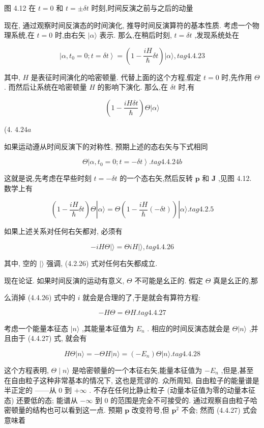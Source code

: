 图 4.12 在 $t = 0$ 和 $t = \pm {\delta t}$ 时刻,时间反演之前与之后的动量

现在, 通过观察时间反演态的时间演化, 推导时间反演算符的基本性质. 考虑一个物理系统,在 $t = 0$ 时,由右矢 $|\alpha \rangle$ 表示. 那么,在稍后时刻, $t = {\delta t}$ ,发现系统处在

$$
\left| {\alpha ,{t}_{0} = 0;t = {\delta t}}\right\rangle = \left( {1 - \frac{iH}{\hslash }{\delta t}}\right) |\alpha \rangle , tag{4. 4.23}
$$

其中, $H$ 是表征时间演化的哈密顿量. 代替上面的这个方程,假定 $t = 0$ 时,先作用 $\Theta$ . 而然后让系统在哈密顿量 $H$ 的影响下演化. 那么,在 ${\delta t}$ 时,有

$$
\left( {1 - \frac{iH\delta t}{\hslash }}\right) \Theta |\alpha \rangle
$$

(4. ${4.24a}$

如果运动遵从时间反演下的对称性, 预期上述的态右矢与下式相同

$$
\Theta \left| {\alpha ,{t}_{0} = 0;t = - {\delta t}}\right\rangle . tag{4. 4.24b}
$$

这就是说,先考虑在早些时刻 $t = - {\delta t}$ 的一个态右矢,然后反转 $\mathbf{p}$ 和 $\mathbf{J}$ ,见图 4.12. 数学上有

$$
\left( {1 - \frac{iH}{\hslash }{\delta t}}\right) \Theta \left| {\alpha \rangle = \Theta \left( {1 - \frac{iH}{\hslash }\left( {-{\delta t}}\right) }\right) }\right| \alpha \rangle . tag{4. 2.5}
$$

如果上述关系对任何右矢都对, 必须有

$$
- {iH\Theta }\left| {\rangle = {\Theta iH}}\right| \rangle , tag{4. 4.26}
$$

其中, 空的 $|\rangle$ 强调, (4.2.26) 式对任何右矢都成立.

现在论证. 如果时间反演的运动有意义, $\Theta$ 不可能是幺正的. 假定 $\Theta$ 真是幺正的,那

么消掉 (4.4.26) 式中的 $i$ 就会是合理的了,于是就会有算符方程:

$$
- {H\Theta } = {\Theta H}. tag{4. 4.27}
$$

考虑一个能量本征态 $|n\rangle$ ,其能量本征值为 ${E}_{n}$ . 相应的时间反演态就会是 $\Theta |n\rangle$ ,并且由于 (4.4.27) 式, 就会有

$$
{H\Theta }\left| {n\rangle = - {\Theta H}}\right| n\rangle = \left( {-{E}_{n}}\right) \Theta |n\rangle . tag{4. 4.28}
$$

这个方程表明, $\Theta \mid n\rangle$ 是哈密顿量的一个本征右矢,能量本征值为 $- {E}_{n}$ ,但是,甚至在自由粒子这种非常基本的情况下, 这也是荒谬的. 众所周知, 自由粒子的能量谱是半正定的 ——从 0 到 $+ \infty$ . 不存在任何比静止粒子 (动量本征值为零的动量本征态) 还要低的态; 能谱从 $- \infty$ 到 0 的范围是完全不可接受的. 通过观察自由粒子哈密顿量的结构也可以看到这一点. 预期 $\mathbf{p}$ 改变符号,但 ${\mathbf{p}}^{2}$ 不会; 然而 (4.4.27) 式会意味着

